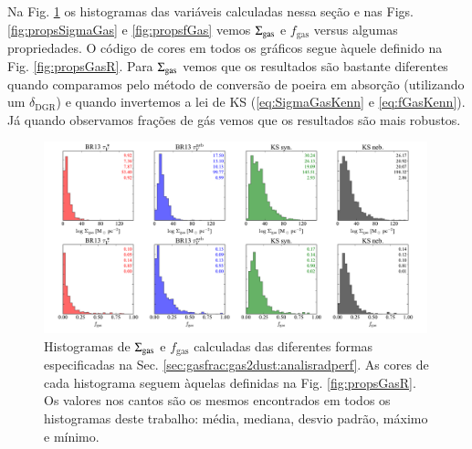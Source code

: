 Na Fig. \ref{fig:histoGas} os histogramas das variáveis calculadas nessa seção e nas Figs.
\ref{fig:propsSigmaGas} e \ref{fig:propsfGas} vemos $\SigmaGas$ e $f_{\mathrm{gas}}$ versus algumas
propriedades. O código de cores em todos os gráficos segue àquele definido na Fig.
\ref{fig:propsGasR}. Para $\SigmaGas$ vemos que os resultados são bastante diferentes quando
comparamos pelo método de conversão de poeira em absorção (utilizando um $\delta_{\mathrm{DGR}}$) e
quando invertemos a lei de KS (\eqref{eq:SigmaGasKenn} e \eqref{eq:fGasKenn}). Já quando observamos
frações de gás vemos que os resultados são mais robustos.

\begin{figure}
	\centering
	\includegraphics[width=0.99\textwidth]{figuras/histo_gas_R.pdf}
	\caption[Histogramas de $\SigmaGas$ e $f_{\mathrm{gas}}$.]
	{Histogramas de $\SigmaGas$ e $f_{\mathrm{gas}}$ calculadas das diferentes formas especificadas
na Sec. \ref{sec:gasfrac:gas2dust:analisradperf}. As cores de cada histograma seguem àquelas
definidas na Fig. \ref{fig:propsGasR}. Os valores nos cantos são os mesmos encontrados em todos os
histogramas deste trabalho: média, mediana, desvio padrão, máximo e mínimo.}
	\label{fig:histoGas}
\end{figure}


